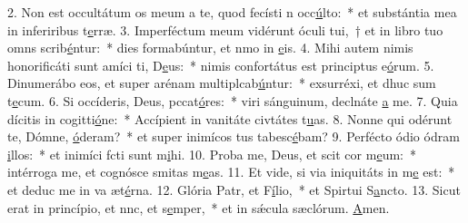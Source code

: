 2. Non est occultátum os meum a te, quod fecísti n occ\uline{ú}lto:~* et substántia mea in inferiribus t\uline{e}rræ.
3. Imperféctum meum vidérunt óculi tui,~† et in libro tuo omns scrib\uline{é}ntur:~* dies formabúntur, et nmo in \uline{e}is.
4. Mihi autem nimis honorificáti sunt amíci ti, D\uline{e}us:~* nimis confortátus est principtus e\uline{ó}rum.
5. Dinumerábo eos, et super arénam multiplcab\uline{ú}ntur:~* exsurréxi, et dhuc sum t\uline{e}cum.
6. Si occíderis, Deus, pccat\uline{ó}res:~* viri sánguinum, declnáte \uline{a} me.
7. Quia dícitis in cogitti\uline{ó}ne:~* Accípient in vanitáte civtátes t\uline{u}as.
8. Nonne qui odérunt te, Dómne, \uline{ó}deram?~* et super inimícos tus tabesc\uline{é}bam?
9. Perfécto ódio ódram \uline{i}llos:~* et inimíci fcti sunt m\uline{i}hi.
10. Proba me, Deus, et scit cor m\uline{e}um:~* intérroga me, et cognósce smitas m\uline{e}as.
11. Et vide, si via iniquitáts in m\uline{e} est:~* et deduc me in va æt\uline{é}rna.
12. Glória Patr, et F\uline{í}lio,~* et Spirtui S\uline{a}ncto.
13. Sicut erat in princípio, et nnc, et s\uline{e}mper,~* et in sǽcula sæclórum. \uline{A}men.
